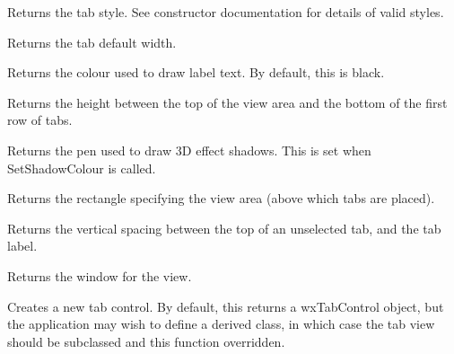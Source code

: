 
Returns the tab style. See constructor documentation for details of valid styles.



Returns the tab default width.



Returns the colour used to draw label text. By default, this is
black.



Returns the height between the top of the view area and the bottom of the first
row of tabs.



Returns the pen used to draw 3D effect shadows. This is set when
SetShadowColour is called. 



Returns the rectangle specifying the view area (above which tabs are
placed).



Returns the vertical spacing between the top of an unselected tab, and the tab label.



Returns the window for the view.



Creates a new tab control. By default, this returns a wxTabControl object, but the application may wish
to define a derived class, in which case the tab view should be subclassed and this function overridden.



